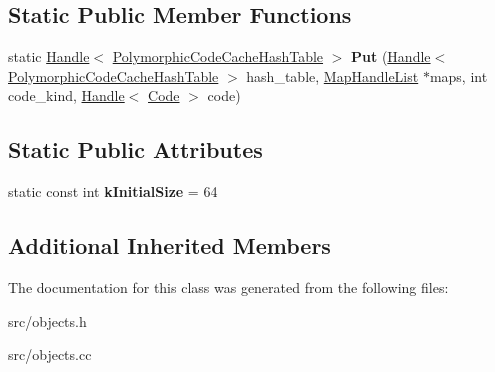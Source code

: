 \subsection*{Static Public Member Functions}
\begin{DoxyCompactItemize}
\item 
\hypertarget{classv8_1_1internal_1_1_polymorphic_code_cache_hash_table_a2fa2024d3861af86d185ede757136113}{}static \hyperlink{classv8_1_1internal_1_1_handle}{Handle}$<$ \hyperlink{classv8_1_1internal_1_1_polymorphic_code_cache_hash_table}{Polymorphic\+Code\+Cache\+Hash\+Table} $>$ {\bfseries Put} (\hyperlink{classv8_1_1internal_1_1_handle}{Handle}$<$ \hyperlink{classv8_1_1internal_1_1_polymorphic_code_cache_hash_table}{Polymorphic\+Code\+Cache\+Hash\+Table} $>$ hash\+\_\+table, \hyperlink{classv8_1_1internal_1_1_list}{Map\+Handle\+List} $\ast$maps, int code\+\_\+kind, \hyperlink{classv8_1_1internal_1_1_handle}{Handle}$<$ \hyperlink{classv8_1_1internal_1_1_code}{Code} $>$ code)\label{classv8_1_1internal_1_1_polymorphic_code_cache_hash_table_a2fa2024d3861af86d185ede757136113}

\end{DoxyCompactItemize}
\subsection*{Static Public Attributes}
\begin{DoxyCompactItemize}
\item 
\hypertarget{classv8_1_1internal_1_1_polymorphic_code_cache_hash_table_ae343fb7cd202b78eeed682d1153ecf9f}{}static const int {\bfseries k\+Initial\+Size} = 64\label{classv8_1_1internal_1_1_polymorphic_code_cache_hash_table_ae343fb7cd202b78eeed682d1153ecf9f}

\end{DoxyCompactItemize}
\subsection*{Additional Inherited Members}


The documentation for this class was generated from the following files\+:\begin{DoxyCompactItemize}
\item 
src/objects.\+h\item 
src/objects.\+cc\end{DoxyCompactItemize}
